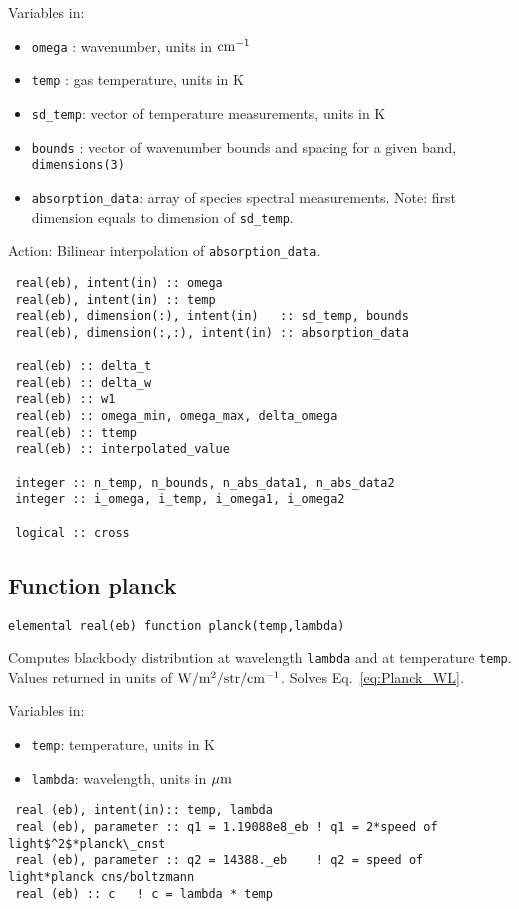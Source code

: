 Variables in:
\begin{itemize}
 \item \verb=omega=  : wavenumber, units in $\rm cm^{-1}$
 \item \verb=temp=   : gas temperature, units in K
 \item \verb=sd_temp=: vector of temperature measurements, units in K
 \item \verb=bounds= : vector of wavenumber bounds and spacing for a given band, \verb=dimensions(3)=
 \item \verb=absorption_data=: array of species spectral measurements. Note: first dimension equals to dimension of \verb=sd_temp=.
\end{itemize}

Action: Bilinear interpolation of \verb=absorption_data=.

\begin{lstlisting}
 real(eb), intent(in) :: omega
 real(eb), intent(in) :: temp
 real(eb), dimension(:), intent(in)   :: sd_temp, bounds
 real(eb), dimension(:,:), intent(in) :: absorption_data

 real(eb) :: delta_t
 real(eb) :: delta_w
 real(eb) :: w1
 real(eb) :: omega_min, omega_max, delta_omega
 real(eb) :: ttemp
 real(eb) :: interpolated_value

 integer :: n_temp, n_bounds, n_abs_data1, n_abs_data2
 integer :: i_omega, i_temp, i_omega1, i_omega2

 logical :: cross
\end{lstlisting}

\subsection{Function planck}

\begin{lstlisting}
elemental real(eb) function planck(temp,lambda)
\end{lstlisting}
Computes blackbody distribution at wavelength \verb=lambda= and at temperature \verb=temp=. Values returned in units of $\rm W/m^{2}/str/cm^{-1}$. Solves Eq.~\ref{eq:Planck_WL}.

Variables in:
\begin{itemize}
 \item \verb=temp=: temperature, units in K
 \item \verb=lambda=: wavelength, units in $\rm \mu m$
\end{itemize}

\begin{lstlisting}
 real (eb), intent(in):: temp, lambda
 real (eb), parameter :: q1 = 1.19088e8_eb ! q1 = 2*speed of light$^2$*planck\_cnst
 real (eb), parameter :: q2 = 14388._eb    ! q2 = speed of light*planck cns/boltzmann
 real (eb) :: c   ! c = lambda * temp
\end{lstlisting}

